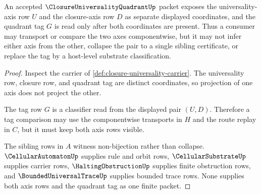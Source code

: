 \begin{theorem}
\label{thm:closure-universality-axis-independence-boundary}
An accepted $\ClosureUniversalityQuadrantUp$ packet exposes the universality-axis row $U$ and the closure-axis row $D$ as separate displayed coordinates, and the quadrant tag $G$ is read only after both coordinates are present. Thus a consumer may transport or compare the two axes componentwise, but it may not infer either axis from the other, collapse the pair to a single sibling certificate, or replace the tag by a host-level substrate classification.
\end{theorem}
\begin{proof}
Inspect the carrier of \autoref{def:closure-universality-carrier}. The universality row, closure row, and quadrant tag are distinct coordinates, so projection of one axis does not project the other.

The tag row $G$ is a classifier read from the displayed pair $(U,D)$. Therefore a tag comparison may use the componentwise transports in $H$ and the route replay in $C$, but it must keep both axis rows visible.

The sibling rows in $A$ witness non-bijection rather than collapse. $\CellularAutomatonUp$ supplies rule and orbit rows, $\CellularSubstrateUp$ supplies carrier rows, $\HaltingObstructionUp$ supplies finite obstruction rows, and $\BoundedUniversalTraceUp$ supplies bounded trace rows. None supplies both axis rows and the quadrant tag as one finite packet.
\end{proof}

